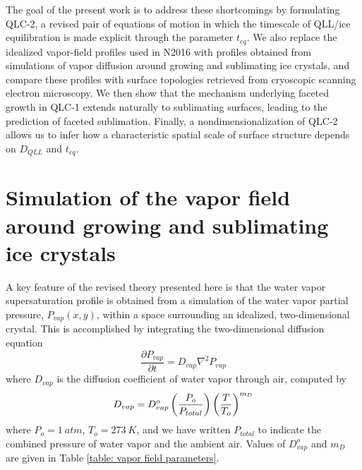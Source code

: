 \documentclass[draft]{agujournal2019}
\begin{document}
The goal of the present work is to address these shortcomings by formulating QLC-2, a revised pair of equations of motion in which the timescale of QLL/ice equilibration is made explicit through the parameter $t_{eq}$. We also replace the idealized vapor-field profiles used in N2016 with profiles obtained from simulations of vapor diffusion around growing and sublimating ice crystals, and compare these profiles with surface topologies retrieved from cryoscopic scanning electron microscopy. We then show that the mechanism underlying faceted growth in QLC-1 extends naturally to sublimating surfaces, leading to the prediction of faceted sublimation. Finally, a nondimensionalization of QLC-2 allows us to infer how a characteristic spatial scale of surface structure depends on $D_{QLL}$ and $t_{eq}$.

\section{Simulation of the vapor field around growing and sublimating ice crystals}

A key feature of the revised theory presented here is that the water vapor supersaturation profile is obtained from a simulation of the water vapor partial pressure, $P_{vap}(x,y)$, within a space surrounding an idealized, two-dimensional crystal. This is accomplished by integrating the two-dimensional diffusion equation
\begin{equation}
    \label{eq:vapor}
    \frac{\partial P_{vap}}{\partial t} = D_{vap}\nabla^2P_{vap}
\end{equation}
where $D_{vap}$ is the diffusion coefficient of water vapor through air, computed by
\begin{equation}
    \label{eq:Dvap}
    D_{vap} = D_{vap}^o
    \left({P_o \over P_{total}}\right)
    \left({T \over T_o}  \right)
    ^{m_D}
\end{equation}
where $P_o=1 \ atm$, $T_o=273 \ K$, and we have written $P_{total}$ to indicate the combined pressure of water vapor and the ambient air. Values of $D_{vap}^o$ and $m_D$ are given in Table \ref{table: vapor field parameters}.
\end{document}
